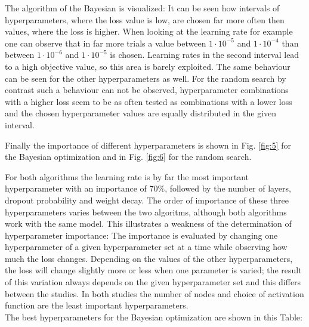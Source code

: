 The algorithm of the Bayesian is visualized:
It can be seen how intervals of hyperparameters, where the loss value is low, are chosen far more often then values, where the loss is higher. When looking at the learning rate for example
one can observe that in far more trials a value between $1 \cdot 10^{-5}$ and $1 \cdot 10^{-4}$ than between $1 \cdot 10^{-6}$ and $1 \cdot 10^{-5}$ is chosen. Learning rates in the second interval
lead to a high objective value, so this area is barely exploited. The same behaviour can be seen for the other hyperparameters as well.
For the random search by contrast such a behaviour can not be observed, hyperparameter combinations with a higher loss seem to be as often tested as combinations with a lower loss and the chosen
hyperparameter values are equally distributed in the given interval.

Finally the importance of different hyperparameters is shown in Fig. \ref{fig:5} for the Bayesian optimization and in Fig. \ref{fig:6} for the random search.


For both algorithms the learning rate is by far the most important hyperparameter with an importance of $70 \%$, followed by the number of layers, dropout probability and weight decay.
The order of importance of these three hyperparameters varies between the two algoritms, although both algorithms work with the same model. 
This illustrates a weakness of the determination of hyperparameter importance: The importance is evaluated by changing one hyperparameter of a given hyperparameter set at a time while observing how much the loss changes.
Depending on the values of the other hyperparameters, the loss will change slightly more or less when one parameter is varied; the result of this variation always depends on the given
hyperparameter set and this differs between the studies. In both studies the number of nodes and choice of activation function are the least important hyperparameters. \\

The best hyperparameters for the Bayesian optimization are shown in this Table:


